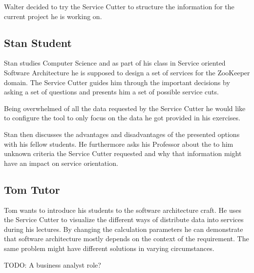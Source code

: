 Walter decided to try the Service Cutter to structure the information for the current project he is working on.



\subsection{Stan Student}

Stan studies Computer Science and as part of his class in Service oriented Software Architecture he is supposed to design a set of services for the ZooKeeper domain. The Service Cutter guides him through the important decisions by asking a set of questions and presents him a set of possible service cuts. 

Being overwhelmed of all the data requested by the Service Cutter he would like to configure the tool to only focus on the data he got provided in his exercises. 

Stan then discusses the advantages and disadvantages of the presented options with his fellow students. He furthermore asks his Professor about the to him unknown criteria the Service Cutter requested and why that information might have an impact on service orientation. 


\subsection{Tom Tutor}

Tom wants to introduce his students to the software architecture craft. He uses the Service Cutter to visualize the different ways of distribute data into services during his lectures. By changing the calculation parameters he can demonstrate that software architecture mostly depends on the context of the requirement. The same problem might have different solutions in varying circumstances.

TODO: A business analyst role?
